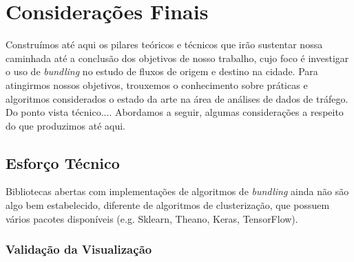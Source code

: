 \chapter{Considerações Finais}
\label{cap:plano-de-trabalho}

  Construímos até aqui os pilares teóricos e técnicos que irão sustentar nossa
caminhada até a conclusão dos objetivos de nosso trabalho, cujo foco é
investigar o uso de \emph{bundling} no estudo de fluxos de origem e destino na
cidade. Para atingirmos nossos
objetivos, trouxemos o conhecimento sobre práticas e algoritmos
considerados o estado da arte na área de análises de dados de tráfego. Do ponto
vista técnico.... Abordamos
a seguir, algumas considerações a respeito do que produzimos até aqui.

\section{Esforço Técnico}

  Bibliotecas abertas com implementações de algoritmos de \emph{bundling} ainda
não são algo bem estabelecido, diferente de algoritmos de clusterização, que
possuem vários pacotes disponíveis (e.g. Sklearn, Theano, Keras, TensorFlow). 



\subsection{Validação da Visualização}

